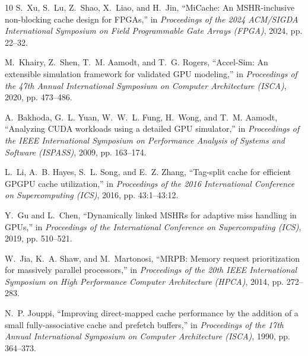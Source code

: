 \documentclass[conference,letterpaper]{IEEEtran}
\begin{document}
\begin{thebibliography}{10}
S.~Xu, S.~Lu, Z.~Shao, X.~Liao, and H.~Jin, ``{MiCache}: An {MSHR}-inclusive
  non-blocking cache design for {FPGAs},'' in \emph{Proceedings of the 2024
  ACM/SIGDA International Symposium on Field Programmable Gate Arrays (FPGA)},
  2024, pp. 22--32.

M.~Khairy, Z.~Shen, T.~M. Aamodt, and T.~G. Rogers, ``{Accel-Sim}: An
  extensible simulation framework for validated {GPU} modeling,'' in
  \emph{Proceedings of the 47th Annual International Symposium on Computer
  Architecture (ISCA)}, 2020, pp. 473--486.

A.~Bakhoda, G.~L. Yuan, W.~W.~L. Fung, H.~Wong, and T.~M. Aamodt, ``Analyzing
  {CUDA} workloads using a detailed {GPU} simulator,'' in \emph{Proceedings of
  the IEEE International Symposium on Performance Analysis of Systems and
  Software (ISPASS)}, 2009, pp. 163--174.

L.~Li, A.~B. Hayes, S.~L. Song, and E.~Z. Zhang, ``Tag-split cache for
  efficient {GPGPU} cache utilization,'' in \emph{Proceedings of the 2016
  International Conference on Supercomputing (ICS)}, 2016, pp. 43:1--43:12.

Y.~Gu and L.~Chen, ``Dynamically linked {MSHRs} for adaptive miss handling in
  {GPUs},'' in \emph{Proceedings of the International Conference on
  Supercomputing (ICS)}, 2019, pp. 510--521.

W.~Jia, K.~A. Shaw, and M.~Martonosi, ``{MRPB}: Memory request prioritization
  for massively parallel processors,'' in \emph{Proceedings of the 20th IEEE
  International Symposium on High Performance Computer Architecture (HPCA)},
  2014, pp. 272--283.

N.~P. Jouppi, ``Improving direct-mapped cache performance by the addition of a
  small fully-associative cache and prefetch buffers,'' in \emph{Proceedings of
  the 17th Annual International Symposium on Computer Architecture (ISCA)},
  1990, pp. 364--373.

\end{thebibliography}
\end{document}
